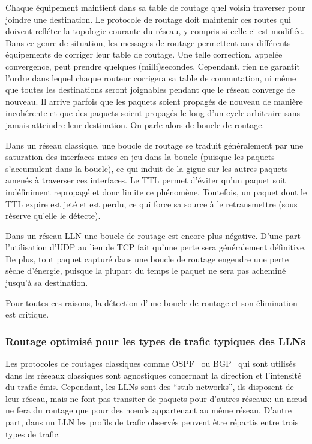 Chaque équipement maintient dans sa table de routage quel voisin traverser pour joindre une destination.
Le protocole de routage doit maintenir ces routes qui doivent refléter la topologie courante du réseau, y compris si celle-ci est modifiée.
Dans ce genre de situation, les messages de routage permettent aux différents équipements de corriger leur table de routage.
Une telle correction, appelée convergence, peut prendre quelques (milli)secondes.
Cependant, rien ne garantit l'ordre dans lequel chaque routeur corrigera sa table de commutation, ni même que toutes les destinations seront joignables pendant que le réseau converge de nouveau.
Il arrive parfois que les paquets soient propagés de nouveau de manière incohérente et que des paquets soient propagés le long d'un cycle arbitraire sans jamais atteindre leur destination. 
On parle alors de boucle de routage.

Dans un réseau classique, une boucle de routage se traduit généralement par une saturation des interfaces mises en jeu dans la boucle (puisque les paquets s'accumulent dans la boucle), ce qui induit de la gigue sur les autres paquets amenés à traverser ces interfaces.
Le \ac{TTL} permet d'éviter qu'un paquet soit indéfiniment repropagé et donc limite ce phénomène.
Toutefois, un paquet dont le \ac{TTL} expire est jeté et est perdu, ce qui force sa source à le retransmettre (sous réserve qu'elle le détecte).

Dans un réseau \ac{LLN} une boucle de routage est encore plus négative.
D'une part l'utilisation d'\ac{UDP} au lieu de \ac{TCP} fait qu'une perte sera généralement définitive.
De plus, tout paquet capturé dans une boucle de routage engendre une perte sèche d'énergie, puisque la plupart du temps le paquet ne sera pas acheminé jusqu'à sa destination.

Pour toutes ces raisons, la détection d'une boucle de routage et son élimination est critique.

\subsubsection{Routage optimisé pour les types de trafic typiques des \ac{LLN}s}

Les protocoles de routages classiques comme \ac{OSPF}~\cite{rfc5340} ou \ac{BGP}~\cite{rfc4271} qui sont utilisés dans les réseaux classiques sont agnostiques concernant la direction et l'intensité du trafic émis.
Cependant, les \ac{LLN}s sont des ``stub networks'', ils disposent de leur réseau, mais ne font pas transiter de paquets pour d'autres réseaux: un nœud ne fera du routage que pour des nœuds appartenant au même réseau.
D'autre part, dans un \ac{LLN} les profils de trafic observés peuvent être répartis entre trois types de trafic.

